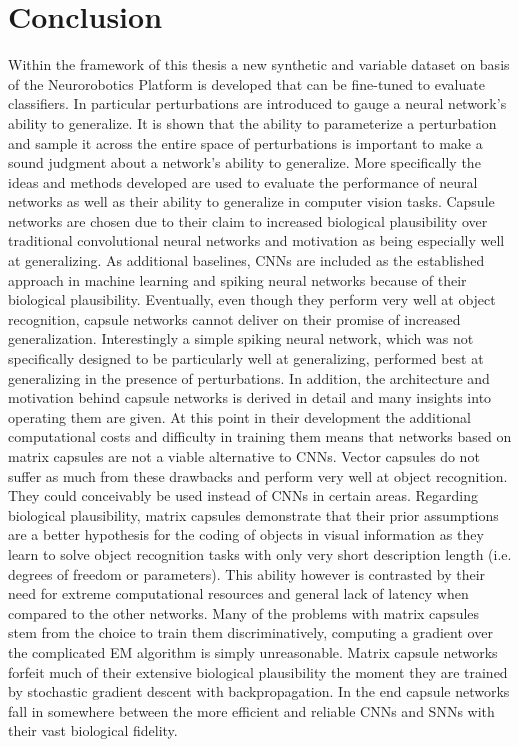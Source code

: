 \section{Conclusion}
Within the framework of this thesis a new synthetic and variable dataset on basis of the Neurorobotics Platform is developed that can be fine-tuned to evaluate classifiers. In particular perturbations are introduced to gauge a neural network’s ability to generalize. It is shown that the ability to parameterize a perturbation and sample it across the entire space of perturbations is important to make a sound judgment about a network’s ability to generalize. More specifically the ideas and methods developed are used to evaluate the performance of neural networks as well as their ability to generalize in computer vision tasks. Capsule networks are chosen due to their claim to increased biological plausibility over traditional convolutional neural networks and motivation as being especially well at generalizing. As additional baselines, CNNs are included as the established approach in machine learning and spiking neural networks because of their biological plausibility. Eventually, even though they perform very well at object recognition, capsule networks cannot deliver on their promise of increased generalization. Interestingly a simple spiking neural network, which was not specifically designed to be particularly well at generalizing, performed best at generalizing in the presence of perturbations. In addition, the architecture and motivation behind capsule networks is derived in detail and many insights into operating them are given. At this point in their development the additional computational costs and difficulty in training them means that networks based on matrix capsules are not a viable alternative to CNNs. Vector capsules do not suffer as much from these drawbacks and perform very well at object recognition. They could conceivably be used instead of CNNs in certain areas. Regarding biological plausibility, matrix capsules demonstrate that their prior assumptions are a better hypothesis for the coding of objects in visual information as they learn to solve object recognition tasks with only very short description length (i.e. degrees of freedom or parameters). This ability however is contrasted by their need for extreme computational resources and general lack of latency when compared to the other networks. Many of the problems with matrix capsules stem from the choice to train them discriminatively, computing a gradient over the complicated EM algorithm is simply unreasonable. Matrix capsule networks forfeit much of their extensive biological plausibility the moment they are trained by stochastic gradient descent with backpropagation. In the end capsule networks fall in somewhere between the more efficient and reliable CNNs and SNNs with their vast biological fidelity.
